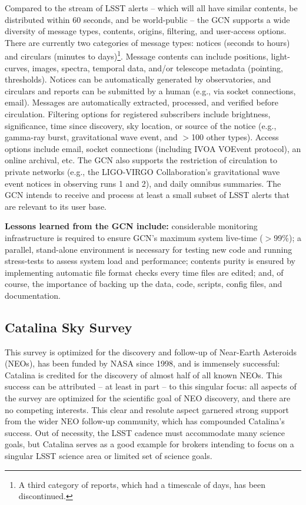 Compared to the stream of  {LSST} alerts -- which will all have similar contents, be distributed within 60 seconds, and be world-public -- the  {GCN} supports a wide diversity of message types, contents, origins, filtering, and user-access options.
There are currently two categories of message types: notices (seconds to hours) and circulars (minutes to days)\footnote{A third category of reports, which had a timescale of days, has been discontinued.}.
Message contents can include positions, light-curves, images, spectra, temporal data, and/or telescope  {metadata} (pointing, thresholds).
Notices can be automatically generated by observatories, and circulars and reports can be submitted by a human (e.g., via socket connections, email).
Messages are automatically extracted, processed, and verified before circulation.
Filtering options for registered subscribers include brightness, significance, time since discovery, sky location, or source of the notice (e.g., gamma-ray burst, gravitational wave event, and $>$100 other types).
Access options include email, socket connections (including  {IVOA} VOEvent protocol), an online archival, etc.
The  {GCN} also supports the restriction of circulation to private networks (e.g., the  {LIGO}-VIRGO Collaboration's gravitational wave event notices in observing runs 1 and 2), and daily omnibus summaries.
The  {GCN} intends to receive and process at least a small subset of  {LSST} alerts that are relevant to its user base. 

{\bf Lessons learned from the  {GCN} include:}
considerable  {monitoring} infrastructure is required to ensure  {GCN}'s maximum system live-time ($>$99\%);
a parallel, stand-alone environment is necessary for testing new code and running stress-tests to assess system load and performance;
contents purity is ensured by implementing automatic file format checks every time files are edited;
and, of course, the importance of backing up the data, code, scripts, config files, and documentation.

\subsection{Catalina Sky Survey}

This survey is optimized for the discovery and follow-up of Near-Earth Asteroids (NEOs), has been funded by  {NASA} since 1998, and is immensely successful: Catalina is credited for the discovery of almost half of all known NEOs.
This success can be attributed -- at least in part -- to this singular focus: all aspects of the survey are optimized for the scientific goal of  {NEO} discovery, and there are no competing interests.
This clear and resolute aspect garnered strong support from the wider  {NEO} follow-up community, which has compounded Catalina's success.
Out of necessity, the  {LSST} cadence must accommodate many science goals, but Catalina serves as a good example for brokers intending to focus on a singular  {LSST} science area or limited set of science goals. 

